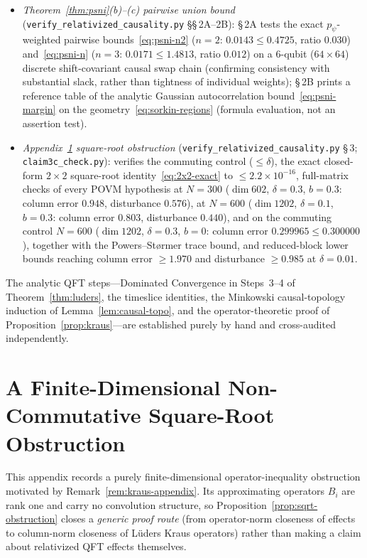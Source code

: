 \documentclass[11pt,a4paper]{article}
\theoremstyle{definition}
\theoremstyle{remark}
\begin{document}
\begin{itemize}[leftmargin=*,nosep]
\item \emph{Theorem~\ref{thm:psni}(b)--(c) pairwise union bound} (\texttt{verify\_\allowbreak relativized\_\allowbreak causality.py} \S\S\,2A--2B): \S\,2A tests the exact $p_\psi$-weighted pairwise bounds~\eqref{eq:psni-n2} ($n=2$: $0.0143 \le 0.4725$, ratio $0.030$) and~\eqref{eq:psni-n} ($n=3$: $0.0171 \le 1.4813$, ratio $0.012$) on a $6$-qubit ($64\times 64$) discrete shift-covariant causal swap chain (confirming consistency with substantial slack, rather than tightness of individual weights); \S\,2B prints a reference table of the analytic Gaussian autocorrelation bound~\eqref{eq:psni-margin} on the geometry~\eqref{eq:sorkin-regions} (formula evaluation, not an assertion test).
\item \emph{Appendix~\ref{app:sqrt} square-root obstruction} (\texttt{verify\_\allowbreak relativized\_\allowbreak causality.py} \S\,3; \texttt{claim3c\_\allowbreak check.py}): verifies the commuting control ($\le \delta$), the exact closed-form $2\times 2$ square-root identity~\eqref{eq:2x2-exact} to $\le 2.2\times 10^{-16}$, full-matrix checks of every POVM hypothesis at $N=300$ ($\dim 602$, $\delta=0.3$, $b=0.3$: column error $0.948$, disturbance $0.576$), at $N=600$ ($\dim 1202$, $\delta=0.1$, $b=0.3$: column error $0.803$, disturbance $0.440$), and on the commuting control $N=600$ ($\dim 1202$, $\delta=0.3$, $b=0$: column error $0.299965\le 0.300000$), together with the Powers--St\o rmer trace bound, and reduced-block lower bounds reaching column error $\ge 1.970$ and disturbance $\ge 0.985$ at $\delta=0.01$.
\end{itemize}
The analytic QFT steps---Dominated Convergence in Steps~3--4 of Theorem~\ref{thm:luders}, the timeslice identities, the Minkowski causal-topology induction of Lemma~\ref{lem:causal-topo}, and the operator-theoretic proof of Proposition~\ref{prop:kraus}---are established purely by hand and cross-audited independently.

\appendix
\section{A Finite-Dimensional Non-Commutative Square-Root Obstruction}
\label{app:sqrt}

This appendix records a purely finite-dimensional operator-inequality obstruction motivated by Remark~\ref{rem:kraus-appendix}. Its approximating operators $B_i$ are rank one and carry no convolution structure, so Proposition~\ref{prop:sqrt-obstruction} closes a \emph{generic proof route} (from operator-norm closeness of effects to column-norm closeness of L\"uders Kraus operators) rather than making a claim about relativized QFT effects themselves.
\end{document}
